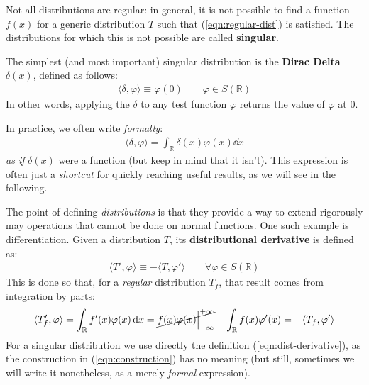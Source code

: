 \documentclass[../template.tex]{subfiles}
\begin{document}
Not all distributions are regular: in general, it is not possible to find a function $f(x)$ for a generic distribution $T$ such that (\ref{eqn:regular-dist}) is satisfied. The distributions for which this is not possible are called \textbf{singular}.

\medskip

The simplest (and most important) singular distribution is the \textbf{Dirac Delta}  $\delta(x)$, defined as follows:
\begin{align*}
    \langle \delta, \varphi \rangle \equiv \varphi(0) \qquad \varphi \in S(\mathbb{R})
\end{align*} 
In other words, applying the $\delta$ to any test function $\varphi$ returns the value of $\varphi$ at $0$.

In practice, we often write \textit{formally}:
\begin{align*}
    \langle \delta, \varphi \rangle = \int_{\mathbb{R}} \delta(x) \varphi(x) \dd{x}
\end{align*}
\textit{as if} $\delta(x)$ were a function (but keep in mind that it isn't). This expression is often just a \textit{shortcut} for quickly reaching useful results, as we will see in the following.

\medskip

The point of defining \textit{distributions} is that they provide a way to extend rigorously may operations that cannot be done on normal functions.  One such example is differentiation. Given a distribution $T$, its \textbf{distributional derivative} is defined as:
\begin{align} \label{eqn:dist-derivative}
    \langle T', \varphi \rangle \equiv - \langle T, \varphi' \rangle \qquad \forall \varphi \in S(\mathbb{R})
\end{align}  
This is done so that, for a \textit{regular} distribution $T_f$, that result comes from integration by parts:
\begin{align} \label{eqn:construction}
    \langle T'_f, \varphi \rangle = \int_{\mathbb{R}} f'(x) \varphi(x) \dd{x} = \cancel{f(x) \varphi(x) \Big|_{-\infty}^{+\infty}} - \int_{\mathbb{R}} f(x) \varphi'(x) = - \langle T_f, \varphi' \rangle
\end{align} 
For a singular distribution we use directly the definition (\ref{eqn:dist-derivative}), as the construction in (\ref{eqn:construction}) has no meaning (but still, sometimes we will write it nonetheless, as a merely \textit{formal} expression).
\end{document}
